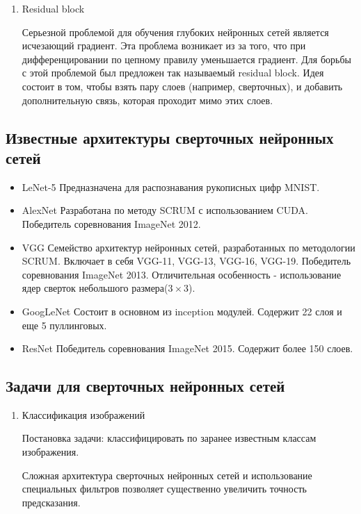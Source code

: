 {\begin{enumerate}
    \item Residual block

          Серьезной проблемой для обучения глубоких нейронных сетей является исчезающий градиент. Эта
          проблема возникает из за того, что при дифференцировании по цепному правилу уменьшается
          градиент. Для борьбы с этой проблемой был предложен так называемый residual block. Идея состоит
          в том, чтобы взять пару слоев (например, сверточных), и добавить дополнительную связь, которая
          проходит мимо этих слоев.
\end{enumerate}

\subsection{Известные архитектуры сверточных нейронных сетей}
\begin{itemize}
    \item LeNet-5 Предназначена для распознавания рукописных цифр MNIST.
    \item AlexNet Разработана по методу SCRUM с использованием CUDA. Победитель соревнования ImageNet 2012.
    \item VGG Семейство архитектур нейронных сетей, разработанных по методологии SCRUM. Включает в себя
          VGG-11, VGG-13, VGG-16, VGG-19. Победитель соревнования ImageNet 2013. Отличительная особенность -
          использование ядер сверток небольшого размера(\(3 \times 3\)).
    \item GoogLeNet Состоит в основном из inception модулей. Содержит 22 слоя и еще 5 пуллинговых.
    \item ResNet Победитель соревнования ImageNet 2015. Содержит более 150 слоев.
\end{itemize}

\subsection{Задачи для сверточных нейронных сетей}

\begin{enumerate}
    \item Классификация изображений

          Постановка задачи: классифицировать по заранее известным классам изображения.

          Сложная архитектура сверточных нейронных сетей и использование специальных фильтров позволяет
          существенно увеличить точность предсказания.


\end{enumerate}}
